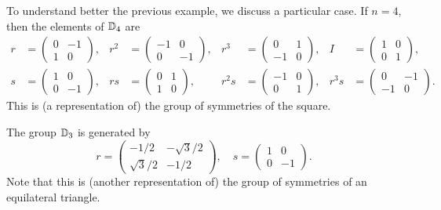 To understand better the previous example, 
we discuss a particular case. 
If $n=4$, 
then the elements of $\mathbb{D}_4$ are  
\begin{align*}
r&=\begin{pmatrix}
0 & -1\\
1 & 0
\end{pmatrix},
&
r^2&=\begin{pmatrix}
    -1 & 0\\
    0 & -1
\end{pmatrix},
&r^3&=\begin{pmatrix}
0 & 1\\
-1 & 0
\end{pmatrix},
&
I&=\begin{pmatrix}
        1 & 0\\
        0 & 1
\end{pmatrix},\\
s&=\begin{pmatrix}
1 & 0\\
0 & -1
\end{pmatrix},
&
rs&=\begin{pmatrix}
    0 & 1\\
    1 & 0
\end{pmatrix},
&r^2s&=\begin{pmatrix}
-1 & 0\\
0 & 1
\end{pmatrix},
&
r^3s&=\begin{pmatrix}
    0 & -1\\
    -1 & 0
\end{pmatrix}.
\end{align*}
This is (a representation of) the group of symmetries of the square. 

\begin{exercise}
\label{xca:D3}
The group $\mathbb{D}_3$ is generated by 
\[
r=\begin{pmatrix}
-1/2 & -\sqrt{3}/2\\
\sqrt{3}/2 & -1/2
\end{pmatrix},
\quad
s=\begin{pmatrix}
        1 & 0\\
        0 & -1
\end{pmatrix}.
\]
Note that this is (another representation of) the group of symmetries of an equilateral  
triangle. 
\end{exercise}


